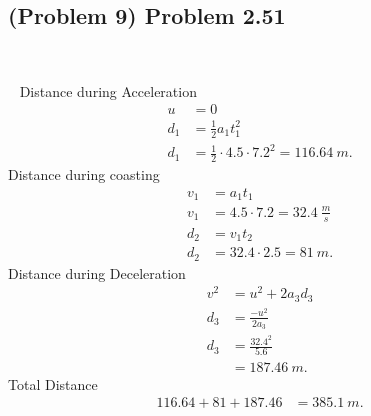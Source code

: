 \subsection{(Problem 9) Problem 2.51}

~

\begin{solution}

	~
	Distance during Acceleration
	\begin{align*}
		u &= 0 \\
		d_1 &= \frac{1}{2} a_1 t_1^2 \\
		d_1 &= \frac{1}{2} \cdot 4.5 \cdot 7.2^2 = \SI{116.64}{m}
		.\end{align*}
	Distance during coasting
	\begin{align*}
		v_1 &= a_1 t_1 \\
		v_1 &= 4.5 \cdot 7.2 = \SI{32.4}{\frac{m}{s}} \\
		d_2 &= v_1 t_2 \\
		d_2 &= 32.4 \cdot 2.5 = \SI{81}{m}
		.\end{align*}
	Distance during Deceleration
	\begin{align*}
		v^2 &= u^2 + 2a_3 d_3 \\
		d_3 &= \frac{-u^2}{2a_3} \\
		d_3 &= \frac{32.4^2}{5.6} \\
		&= \SI{187.46}{m}
		.\end{align*}
	Total Distance
	\begin{align*}
		116.64 + 81 + 187.46 &= \SI{385.1}{m}
		.\end{align*}
\end{solution}
